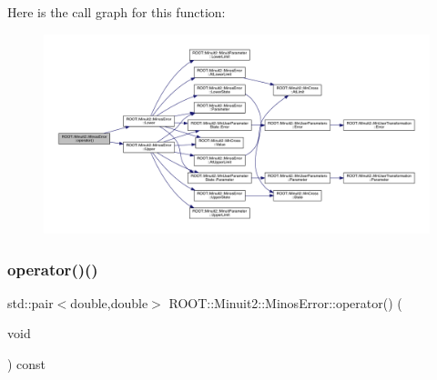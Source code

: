 Here is the call graph for this function\+:
\nopagebreak
\begin{figure}[H]
\begin{center}
\leavevmode
\includegraphics[width=350pt]{d2/dd1/classROOT_1_1Minuit2_1_1MinosError_ae5c75a96400736de9741f6c5b8314e31_cgraph}
\end{center}
\end{figure}
\mbox{\label{classROOT_1_1Minuit2_1_1MinosError_ae5c75a96400736de9741f6c5b8314e31}} 
\subsubsection{\texorpdfstring{operator()()}{operator()()}\hspace{0.1cm}{\footnotesize\ttfamily [6/6]}}
{\footnotesize\ttfamily std\+::pair$<$double,double$>$ R\+O\+O\+T\+::\+Minuit2\+::\+Minos\+Error\+::operator() (\begin{DoxyParamCaption}\item[{void}]{ }\end{DoxyParamCaption}) const\hspace{0.3cm}{\ttfamily [inline]}}

